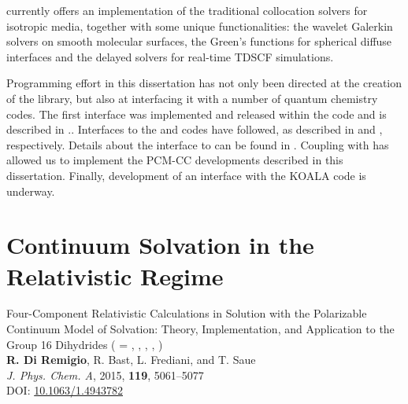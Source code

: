 \pcmsolver currently offers an implementation of the traditional collocation
solvers for isotropic media,\autocite{Tomasi2005-vm}
together with some unique functionalities: the wavelet Galerkin solvers on smooth
molecular surfaces,\autocite{Weijo2010-hy, Bugeanu2015-tp} the Green’s
functions for spherical diffuse interfaces\autocite{DiRemigio2016-nn} and
the delayed solvers for real-time \acrlong*{TDSCF}
simulations.\autocite{Corni2015-pe}

Programming effort in this dissertation has not only been directed at the
creation of the \pcmsolver library, but also at interfacing it with a
number of quantum chemistry codes.
The first interface was implemented and released within the \DIRAC code
and is described in .\autocite{DIRAC15, DiRemigio2015-ou}.
Interfaces to the \LSDALTON\autocite{LSDALTON16, Aidas2013-rp} and
\DALTON\autocite{LSDALTON16, Aidas2013-rp} codes have followed, as
described in  and , respectively.\autocite{Bugeanu2015-tp, pcm-openrsp}
Details about the interface to \ReSpect\autocite{ReSpect-3.5.0} can be
found in .\autocite{pcm-respect}
Coupling with \psicode\autocite{Turney2012-de} has allowed us to implement the
\acrshort{PCM}-\acrshort{CC} developments described in this dissertation.
Finally, development of an interface with the KOALA code is underway.\autocite{Hofener2014-ex, Hofener2016-qz}

\section{Continuum Solvation in the Relativistic Regime}\label{sec:relapcm}

\begin{tcolorbox}
  {\small
  \textsf{Four-Component Relativistic Calculations in Solution with the
  Polarizable Continuum Model of Solvation: Theory,
  Implementation, and Application to the Group 16 Dihydrides
   ( = , , , ,
  )
  }
  \\
  \textbf{R. Di Remigio}, R. Bast, L. Frediani, and T. Saue
  \\
  \textit{J. Phys. Chem. A}, \textrm{2015}, \textbf{119}, 5061--5077
  \\
  DOI: \url{10.1063/1.4943782}
  }
\end{tcolorbox}

